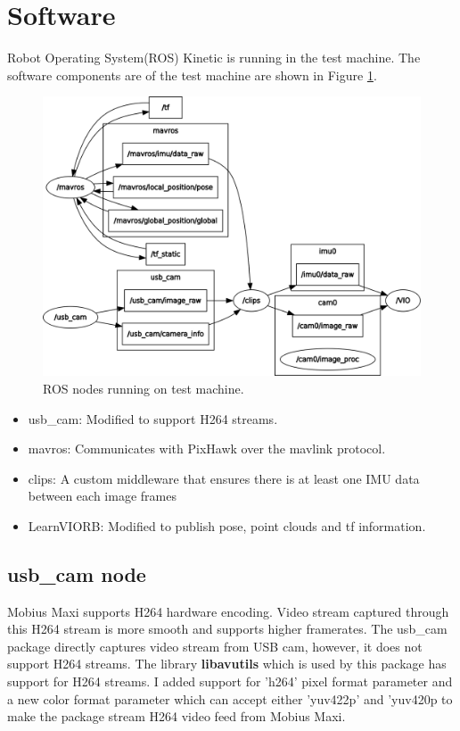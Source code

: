 \section{Software}
Robot Operating System(ROS) Kinetic is running in the test machine. 
The software components are of the test machine are shown in Figure \ref{fig:rosgraph}.

\begin{figure} \label{fig:rosgraph}
	\centering
	\includegraphics[width=5in]{figures/rosgraph}
	\caption[ROS node tunning on test machine]{\small 
		ROS nodes running on test machine. }
\end{figure}

\begin{itemize}
	\item usb\_cam: Modified to support H264 streams.
	\item mavros: Communicates with PixHawk over the mavlink protocol.
	\item clips: A custom middleware that ensures there is at least one IMU data between each image frames
	\item LearnVIORB: Modified to publish pose, point clouds and tf information.
\end{itemize}

\subsection{usb\_cam node}
Mobius Maxi supports H264 hardware encoding. Video stream captured through this H264 stream is more smooth and supports higher framerates. The usb\_cam package directly captures video stream from USB cam, however, it does not support H264 streams.
The library \textbf{libavutils} which is used by this package has support for H264 streams. I added support for 'h264' pixel format parameter and a new color format parameter which can accept either 'yuv422p' and 'yuv420p to make the package stream H264 video feed from Mobius Maxi.
 
